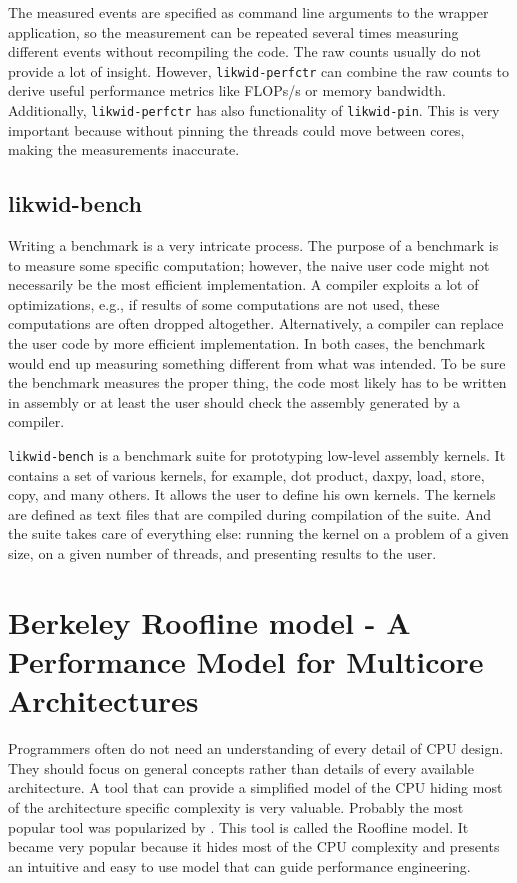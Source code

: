 The measured events are specified as command line arguments to the wrapper application, so the measurement can be repeated several times measuring different events without recompiling the code.
The raw counts usually do not provide a lot of insight. However, \texttt{likwid-perfctr} can combine the raw counts to derive useful performance metrics like FLOPs/s or memory bandwidth.
%
Additionally, \texttt{likwid-perfctr} has also functionality of \texttt{likwid-pin}. This is very important because without pinning the threads could move between cores, making the measurements inaccurate.

\subsection*{likwid-bench}

Writing a benchmark is a very intricate process. The purpose of a benchmark is to measure some specific computation; however, the naive user code might not necessarily be the most efficient implementation. A compiler exploits a lot of optimizations, e.g., if results of some computations are not used, these computations are often dropped altogether. Alternatively, a compiler can replace the user code by more efficient implementation. In both cases, the benchmark would end up measuring something different from what was intended.
To be sure the benchmark measures the proper thing, the code most likely has to be written in assembly or at least the user should check the assembly generated by a compiler.

\texttt{likwid-bench} is a benchmark suite for prototyping low-level assembly kernels. 
It contains a set of various kernels, for example, dot product, daxpy, load, store, copy, and many others. It allows the user to define his own kernels. The kernels are defined as text files that are compiled during compilation of the suite. And the suite takes care of everything else: running the kernel on a problem of a given size, on a given number of threads, and presenting results to the user.

\section[Berkeley Roofline model]{Berkeley Roofline model - A Performance Model for Multicore Architectures}
\label{sec:roofline}

Programmers often do not need an understanding of every detail of CPU design. They should focus on general concepts rather than details of every available architecture. A tool that can provide a simplified model of the CPU hiding most of the architecture specific complexity is very valuable. Probably the most popular tool was popularized by \cite{williams-2009}. This tool is called the Roofline model.
It became very popular because it hides most of the CPU complexity and presents an intuitive and easy to use model that can guide performance engineering.

